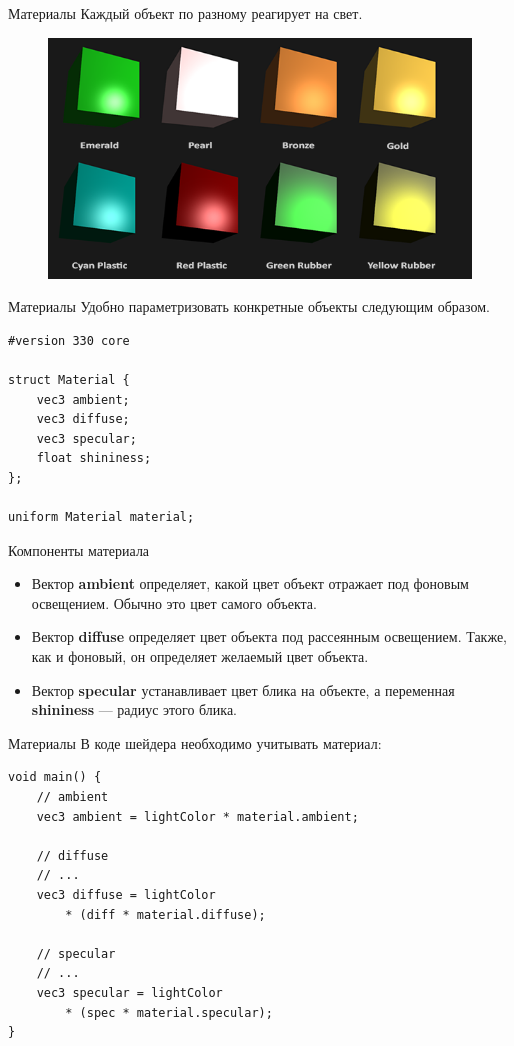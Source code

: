 \documentclass[aspectration=1610,t]{beamer}
\begin{document}
\begin{frame}[fragile]{Материалы}
    Каждый объект по разному реагирует на свет.
    \begin{figure}[htp]
        \centering
        \includegraphics[scale=0.40]{res/materials}
    \end{figure}
\end{frame}

\begin{frame}[fragile]{Материалы}
    Удобно параметризовать конкретные объекты следующим образом.
    {\small \begin{lstlisting}
#version 330 core

struct Material {
    vec3 ambient;
    vec3 diffuse;
    vec3 specular;
    float shininess;
}; 
    
uniform Material material;
    \end{lstlisting}}
\end{frame}

\begin{frame}[fragile]{Компоненты материала}
    \begin{itemize}
        \item Вектор {\bf ambient} определяет, какой цвет объект отражает под фоновым освещением. Обычно это цвет самого объекта.
        \item Вектор {\bf diffuse} определяет цвет объекта под рассеянным освещением. Также, как и фоновый, он определяет желаемый цвет объекта.
        \item Вектор {\bf specular} устанавливает цвет блика на объекте, а переменная {\bf shininess} — радиус этого блика.
    \end{itemize}
\end{frame}

\begin{frame}[fragile]{Материалы}
    В коде шейдера необходимо учитывать материал:
    {\small \begin{lstlisting}
void main() {    
    // ambient
    vec3 ambient = lightColor * material.ambient;

    // diffuse 
    // ...
    vec3 diffuse = lightColor
        * (diff * material.diffuse);

    // specular
    // ...
    vec3 specular = lightColor
        * (spec * material.specular);  
}
    \end{lstlisting}}
\end{frame}
\end{document}
